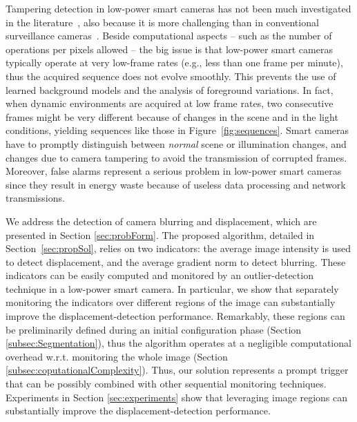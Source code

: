 \documentclass{llncs}
\begin{document}
Tampering detection in low-power smart cameras has not been much investigated in the literature~\cite{alippi2010detecting}, also because it is more challenging than in conventional surveillance cameras~\cite{perrig2004security}. Beside computational aspects -- such as the number of operations per pixels allowed -- the big issue is that low-power smart cameras typically operate at very low-frame rates (e.g., less than one frame per minute), thus the acquired sequence does not evolve smoothly. This prevents the use of learned background models and the analysis of foreground variations. In fact, when dynamic environments are acquired at low frame rates, two consecutive frames might be very different because of changes in the scene and in the light conditions, yielding sequences like those in Figure~\ref{fig:sequences}. Smart cameras have to promptly distinguish between \emph{normal} scene or illumination changes, and changes due to camera tampering to avoid the transmission of corrupted frames. Moreover, false alarms represent a serious problem in low-power smart cameras since they result in energy waste because of useless data processing and network transmissions.

We address the detection of camera blurring and displacement, which are presented in Section \ref{sec:probForm}. The proposed algorithm, detailed in Section~\ref{sec:propSol}, relies on two indicators: the average image intensity is used to detect displacement, and the average gradient norm to detect blurring. These indicators can be easily computed and monitored by an outlier-detection technique in a low-power smart camera. In particular, we show that separately monitoring the indicators over different regions of the image can substantially improve the displacement-detection performance. Remarkably, these regions can be preliminarily defined during an initial configuration phase (Section \ref{subsec:Segmentation}), thus the algorithm operates at a negligible computational overhead w.r.t. monitoring the whole image (Section \ref{subsec:coputationalComplexity}). Thus, our solution represents a prompt trigger that can be possibly combined with other sequential monitoring techniques. Experiments in Section \ref{sec:experiments} show that leveraging image regions can substantially improve the displacement-detection performance. %
\end{document}
